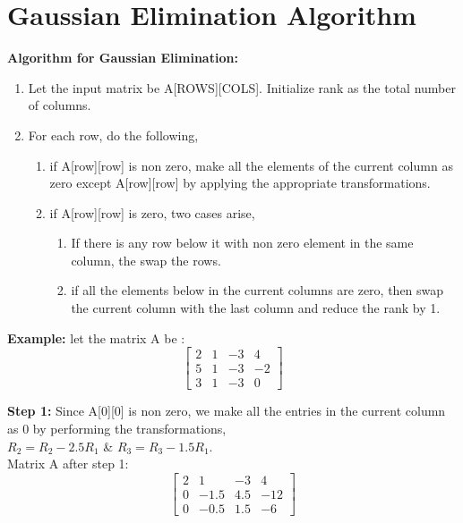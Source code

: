 \documentclass{beamer}
\begin{document}
\section{Gaussian Elimination Algorithm}
\begin{frame}
    \textbf{Algorithm for Gaussian Elimination: }
    \begin{enumerate}
        \item Let the input matrix be A[ROWS][COLS]. Initialize rank as the total number of columns.
        \vspace{5}
        \item For each row, do the following, 
        \vspace{4}
        \begin{enumerate}[I]
            \item if A[row][row] is non zero, make all the elements of the current column as zero except A[row][row] by applying the appropriate transformations.
            \vspace{4}
            \item if A[row][row] is zero, two cases arise,
            \vspace{4}
            \begin{enumerate}[i]
                    \item If there is any row below it with non zero element in the same column, the swap the rows.
                    \vspace{4}
                    \item if all the elements below in the current columns are zero, then swap the current column with the last column and reduce the rank by 1.
            \end{enumerate}
        \end{enumerate}
    \end{enumerate}
\end{frame}

\begin{frame}
\textbf{Example: }
let the matrix A be :
\begin{equation}
    \begin{bmatrix}
        2 & 1 & -3 & 4\\
        5 & 1 & -3 & -2\\
        3 & 1 & -3 & 0
    \end{bmatrix}
\end{equation}


\textbf{Step 1: }Since A[0][0] is non zero, we make all the entries in the current column as 0 by performing the transformations,\\ $R_{2} = R_{2} - 2.5R_{1}$ \& $R_{3} = R_{3} - 1.5R_{1}$.\\
Matrix A after step 1:
\begin{equation}
     \begin{bmatrix}
    2 & 1 & -3 & 4\\
    0 & -1.5 & 4.5 & -12\\
    0 & -0.5 & 1.5 & -6
    \end{bmatrix}  
\end{equation}

\end{frame}
\end{document}
